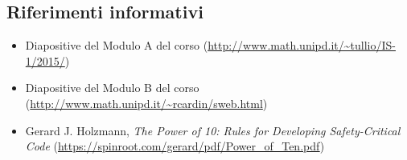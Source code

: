 \subsection{Riferimenti informativi}
\begin{itemize}
\item Diapositive del Modulo A del corso (\url{http://www.math.unipd.it/~tullio/IS-1/2015/})
\item Diapositive del Modulo B del corso (\url{http://www.math.unipd.it/~rcardin/sweb.html})
\item Gerard J. Holzmann, \textit{The Power of 10: Rules for Developing Safety-Critical Code} 
	(\url{https://spinroot.com/gerard/pdf/Power_of_Ten.pdf})
\end{itemize}
